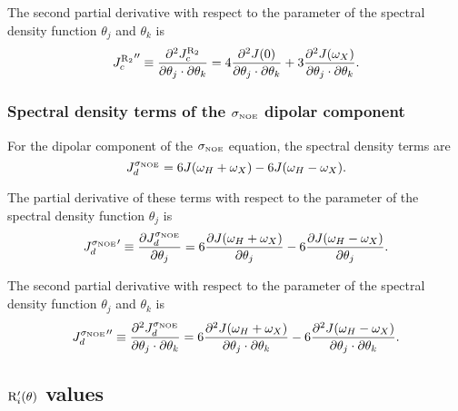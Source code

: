 \noindent The second partial derivative with respect to the parameter of the spectral density function $\theta_j$ and $\theta_k$ is
\begin{equation}
    {J_c^{\mathrm{R}_2}}'' \equiv \frac{\partial^2 J_c^{\mathrm{R}_2}}{\partial \theta_j \cdot \partial \theta_k}
        = 4 \frac{\partial^2 J(0)}{\partial \theta_j \cdot \partial \theta_k}
        + 3 \frac{\partial^2 J(\omega_X)}{\partial \theta_j \cdot \partial \theta_k}.  \label{eq: J terms: JR2c"}
\end{equation}


\subsubsection{Spectral density terms of the $\sigma_{\scriptscriptstyle \mathrm{NOE}}$ dipolar component}

For the dipolar component of the $\sigma_{\scriptscriptstyle \mathrm{NOE}}$ equation, the spectral density terms are
\begin{equation}
    J_d^{\sigma_{\scriptscriptstyle \mathrm{NOE}}} = 6J(\omega_H + \omega_X) - 6J(\omega_H - \omega_X).  \label{eq: J terms: JsigmaNOEd}
\end{equation}

\noindent The partial derivative of these terms with respect to the parameter of the spectral density function $\theta_j$ is
\begin{equation}
    {J_d^{\sigma_{\scriptscriptstyle \mathrm{NOE}}}}' \equiv \frac{\partial J_d^{\sigma_{\scriptscriptstyle \mathrm{NOE}}}}{\partial \theta_j}
        = 6 \frac{\partial J(\omega_H + \omega_X)}{\partial \theta_j}
        - 6 \frac{\partial J(\omega_H - \omega_X)}{\partial \theta_j}.  \label{eq: J terms: JsigmaNOEd'}
\end{equation}

\noindent The second partial derivative with respect to the parameter of the spectral density function $\theta_j$ and $\theta_k$ is
\begin{equation}
    {J_d^{\sigma_{\scriptscriptstyle \mathrm{NOE}}}}'' \equiv \frac{\partial^2 J_d^{\sigma_{\scriptscriptstyle \mathrm{NOE}}}}{\partial \theta_j \cdot \partial \theta_k}
        = 6 \frac{\partial^2 J(\omega_H + \omega_X)}{\partial \theta_j \cdot \partial \theta_k}
        - 6 \frac{\partial^2 J(\omega_H - \omega_X)}{\partial \theta_j \cdot \partial \theta_k}.  \label{eq: J terms: JsigmaNOEd"}
\end{equation}




\subsection{$\mathrm{R}_i'(\theta)$ values}

